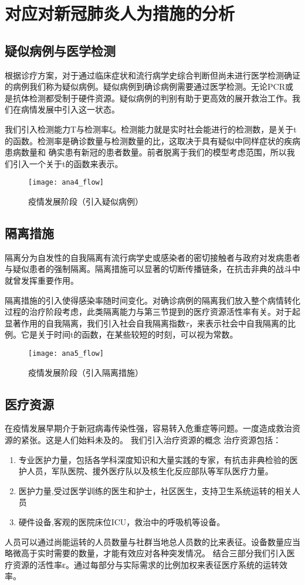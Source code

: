 \documentclass[withoutpreface,bwprint]{cumcmthesis} %
\begin{document}
\section{对应对新冠肺炎人为措施的分析}
\subsection{疑似病例与医学检测}
根据诊疗方案，\cite{ref2}对于通过临床症状和流行病学史综合判断但尚未进行医学检测确证的病例我们称为疑似病例。疑似病例到确诊病例需要通过医学检测。无论PCR或是抗体检测都受制于硬件资源。疑似病例的判别有助于更高效的展开救治工作。我们在病情发展中引入这一状态。
\par
我们引入检测能力T与检测率ξ。检测能力就是实时社会能进行的检测数，是关于t的函数。检测率是确诊数量与检测数量的比，这取决于具有疑似中同样症状的疾病患病数量和
确实患有新冠的患者数量。前者脱离于我们的模型考虑范围，所以我们引入一个关于t的函数来表示。
    \begin{figure}[!h]
        \centering
        \texttt{[image: ana4\_flow]}
        \caption{疫情发展阶段（引入疑似病例）}
        \label{fig:ana2_flow}
    \end{figure}
\subsection{隔离措施}
隔离分为自发性的自我隔离有流行病学史或感染者的密切接触者与政府对发病患者与疑似患者的强制隔离。隔离措施可以显著的切断传播链条，在抗击非典的战斗中就曾发挥重要作用。
\par
隔离措施的引入使得感染率随时间变化。对确诊病例的隔离我们放入整个病情转化过程的治疗阶段考虑，此类隔离能力与第三节提到的医疗资源活性率有关。对于起显著作用的自我隔离，我们引入社会自我隔离指数$\tau $，来表示社会中自我隔离的比例。它是关于时间t的函数，在某些较短的时刻，可以视为常数。
    \begin{figure}[!h]
        \centering
        \texttt{[image: ana5\_flow]}
        \caption{疫情发展阶段（引入隔离措施）}
        \label{fig:ana2_flow}
    \end{figure}
\subsection{医疗资源}
在疫情发展早期介于新冠病毒传染性强，容易转入危重症等问题。一度造成救治资源的紧张。这是人们始料未及的。
我们引入治疗资源的概念
治疗资源包括：

    \begin{enumerate}
        \item 专业医护力量，包括各学科深度知识和大量实践的专家，有抗击非典检验的医护人员，军队医院、援外医疗队以及核生化反应部队等军队医疗力量。
        \item 医护力量,受过医学训练的医生和护士，社区医生，支持卫生系统运转的相关人员
        \item 硬件设备,客观的医院床位ICU，救治中的呼吸机等设备。
    \end{enumerate}
人员可以通过尚能运转的人员数量与社群当地总人员数的比来表征。设备数量应当略微高于实时需要的数量，才能有效应对各种突发情况。
结合三部分我们引入医疗资源的活性率ε。通过每部分与实际需求的比例加权来表征医疗系统的运转效率。
\end{document}
